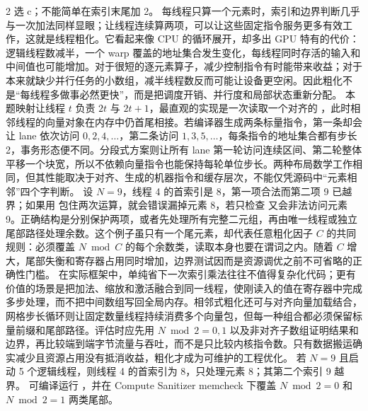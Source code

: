 \begin{solutionexercise}{2}
\conclusionheading 选 c；不能简单在索引末尾加 2。
\discussionheading
{}
每线程只算一个元素时，索引和边界判断几乎与一次加法同样显眼；让线程连续算两项，可以让这些固定指令服务更多有效工作，这就是线程粗化。它看起来像 CPU 的循环展开，却多出 GPU 特有的代价：逻辑线程数减半，一个 warp 覆盖的地址集合发生变化，每线程同时存活的输入和中间值也可能增加。对于很短的逐元素算子，减少控制指令有时能带来收益；对于本来就缺少并行任务的小数组，减半线程数反而可能让设备更空闲。因此粗化不是“每线程多做事必然更快”，而是把调度开销、并行度和局部状态重新分配。
本题映射让线程 $t$ 负责 $2t$ 与 $2t+1$，最直观的实现是一次读取一个对齐的 ，此时相邻线程的向量对象在内存中仍首尾相接。若编译器生成两条标量指令，第一条却会让 lane 依次访问 $0,2,4,\ldots$，第二条访问 $1,3,5,\ldots$，每条指令的地址集合都有步长 2，事务形态便不同。分段式方案则让所有 lane 第一轮访问连续区间、第二轮整体平移一个块宽，所以不依赖向量指令也能保持每轮单位步长。两种布局数学工作相同，但其性能取决于对齐、生成的机器指令和缓存层次，不能仅凭源码中“元素相邻”四个字判断。
设 $N=9$，线程 4 的首索引是 8，第一项合法而第二项 9 已越界；如果用  包住两次运算，就会错误漏掉元素 8，若只检查  又会非法访问元素 9。正确结构是分别保护两项，或者先处理所有完整二元组，再由唯一线程或独立尾部路径处理余数。这个例子虽只有一个尾元素，却代表任意粗化因子 $C$ 的共同规则：必须覆盖 $N\bmod C$ 的每个余数类，读取本身也要在谓词之内。随着 $C$ 增大，尾部失衡和寄存器占用同时增加，边界测试因而是资源调优之前不可省略的正确性门槛。
在实际框架中，单纯省下一次索引乘法往往不值得复杂化代码；更有价值的场景是把加法、缩放和激活融合到同一线程，使刚读入的值在寄存器中完成多步处理，而不把中间数组写回全局内存。相邻式粗化还可与对齐向量加载结合，网格步长循环则让固定数量线程持续消费多个向量包，但每一种组合都必须保留标量前缀和尾部路径。评估时应先用 $N\bmod2=0,1$ 以及非对齐子数组证明结果和边界，再比较端到端字节流量与吞吐，而不是只比较内核指令数。只有数据搬运确实减少且资源占用没有抵消收益，粗化才成为可维护的工程优化。
\variantheading 若 $N=9$ 且启动 5 个逻辑线程，则线程 4 的首索引为 8，只处理元素 8；其第二个索引 9 越界。
\practiceheading 可编译运行 ，并在 Compute Sanitizer memcheck 下覆盖 $N\bmod2=0$ 和 $N\bmod2=1$ 两类尾部。
\end{solutionexercise}

